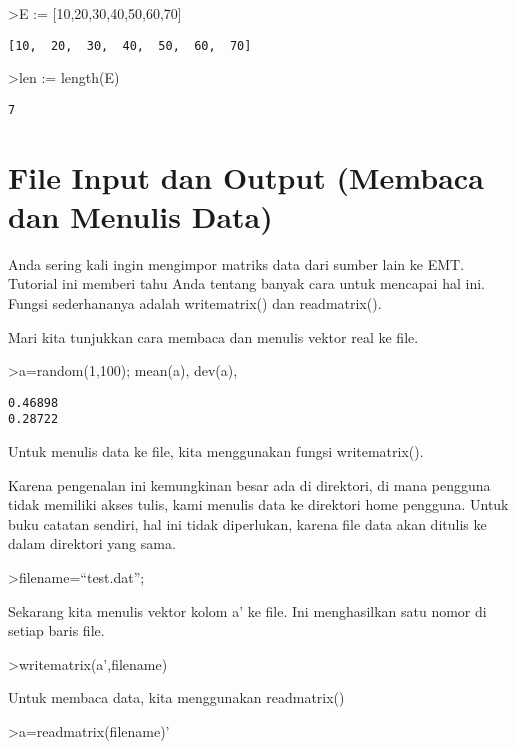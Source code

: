 \documentclass[
]{book}
\begin{document}
\textgreater E := {[}10,20,30,40,50,60,70{]}

\begin{verbatim}
[10,  20,  30,  40,  50,  60,  70]
\end{verbatim}

\textgreater len := length(E)

\begin{verbatim}
7
\end{verbatim}

\chapter{File Input dan Output (Membaca dan Menulis Data)}\label{file-input-dan-output-membaca-dan-menulis-data}

Anda sering kali ingin mengimpor matriks data dari sumber lain ke EMT. Tutorial ini memberi tahu Anda tentang banyak cara untuk mencapai hal ini. Fungsi sederhananya adalah writematrix() dan readmatrix().

Mari kita tunjukkan cara membaca dan menulis vektor real ke file.

\textgreater a=random(1,100); mean(a), dev(a),

\begin{verbatim}
0.46898
0.28722
\end{verbatim}

Untuk menulis data ke file, kita menggunakan fungsi writematrix().

Karena pengenalan ini kemungkinan besar ada di direktori, di mana pengguna tidak memiliki akses tulis, kami menulis data ke direktori home pengguna. Untuk buku catatan sendiri, hal ini tidak diperlukan, karena file data akan ditulis ke dalam direktori yang sama.

\textgreater filename=``test.dat'';

Sekarang kita menulis vektor kolom a' ke file. Ini menghasilkan satu nomor di setiap baris file.

\textgreater writematrix(a',filename)

Untuk membaca data, kita menggunakan readmatrix()

\textgreater a=readmatrix(filename)'
\end{document}
